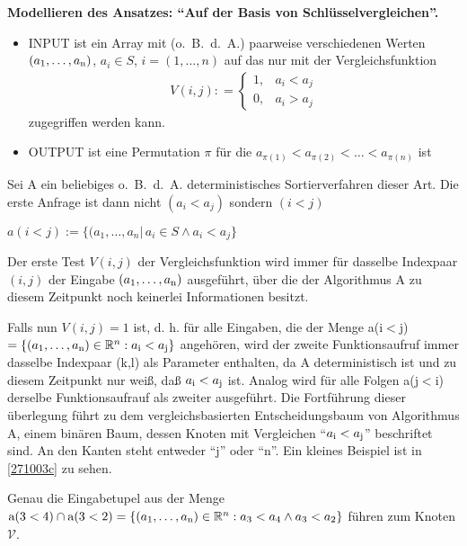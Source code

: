 \begin{beweis}
\textbf{Modellieren des Ansatzes: "`Auf der Basis von Schlüsselvergleichen"'.}
  \begin{itemize}
  \item INPUT ist ein Array mit (o.~B.~d.~A.) paarweise verschiedenen Werten 
  \( (a_1, \dots , a_{\textup{n}})\), \(a_i \in S\), \(i=(1, \dots, n)\) auf das nur
  mit der Vergleichsfunktion  \begin{gather*} V(i,j) : = \left\lbrace
  \begin{array}{ll} 1, & a_i < a_j \\ 0, & a_i > a_j \end{array} \right.\end{gather*}
  zugegriffen werden kann.
  \item OUTPUT ist eine Permutation \( \pi \) für die \( a_{\pi (1)} < a_{\pi (2)} < \dots < a_{\pi (n)} \) ist 
\end{itemize}

Sei A ein beliebiges o.~B.~d.~A. deterministisches Sortierverfahren dieser Art.
Die erste Anfrage ist dann nicht \( (a_i < a_j) \) sondern \( (i < j) \)

  \begin{definition}
  \(a(i<j) := \lbrace (a_1, \dots , a_n \vert\, a_i \in S \wedge a_i < a_j \rbrace \)
  \end{definition}

%
Der erste Test $V(i,j)$ der Vergleichsfunktion wird immer für dasselbe Indexpaar $(i,j)$ der Eingabe \((a_1, \dots , a_{\textup{n}})\)
ausgeführt, über die der Algorithmus A zu diesem Zeitpunkt noch keinerlei Informationen besitzt.

Falls nun $V(i,j)=1$ ist, d. h. für alle Eingaben, die der Menge a(i$<$j)\(=\{(a_1,\ldots,a_{\textup{n}})\in \mathbb{R}^n :
a_{\textup{i}}<a_{\textup{j}}\}\) angehören, wird der zweite Funktionsaufruf immer dasselbe Indexpaar (k,l) als Parameter
enthalten, da A deterministisch ist und zu diesem Zeitpunkt nur weiß, daß \(a_{\textup{i}}<a_{\textup{j}}\) ist. Analog wird für alle
Folgen a(j$<$i) derselbe Funktionsaufrauf als zweiter ausgeführt. Die Fortführung dieser überlegung führt zu dem vergleichsbasierten
Entscheidungsbaum von Algorithmus A, einem binären Baum, dessen Knoten mit Vergleichen "`\(a_{\textup{i}}<a_{\textup{j}}\)"' beschriftet
sind. An den Kanten steht entweder "`j"' oder "`n"'. Ein kleines Beispiel ist in \autoref{271003c} zu sehen.

Genau die Eingabetupel aus der Menge \(\textup{a}(3<4)\cap \textup{a}(3<2)=\{(a_1,\ldots,a_{\textup{n}})\in \mathbb{R}^n : a_3<a_4 \wedge
a_3<a_2\}\) führen zum Knoten $\mathcal{V}$. 


\end{beweis}
